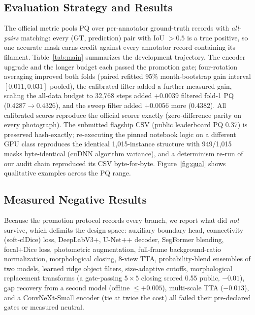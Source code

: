 \documentclass[sigconf]{acmart}
\begin{document}
\subsection{Evaluation Strategy and Results}
The official metric pools PQ over per-annotator ground-truth records with \emph{all-pairs} matching: every (GT, prediction) pair with IoU $>0.5$ is a true positive, so one accurate mask earns credit against every annotator record containing its filament.
Table~\ref{tab:main} summarizes the development trajectory.
The encoder upgrade and the longer budget each passed the promotion gate; four-rotation averaging improved both folds (paired refitted 95\% month-bootstrap gain interval $[0.011, 0.031]$ pooled), the calibrated filter added a further measured gain, scaling the all-data budget to 32{,}768 steps added $+0.0039$ filtered fold-1 PQ (0.4287$\to$0.4326), and the sweep filter added $+0.0056$ more (0.4382).
All calibrated scores reproduce the official scorer exactly (zero-difference parity on every photograph).
The submitted flagship CSV (public leaderboard PQ 0.37) is preserved hash-exactly; re-executing the pinned notebook logic on a different GPU class reproduces the identical 1{,}015-instance structure with 949/1{,}015 masks byte-identical (cuDNN algorithm variance), and a determinism re-run of our audit chain reproduced its CSV byte-for-byte.
Figure~\ref{fig:qual} shows qualitative examples across the PQ range.

\subsection{Measured Negative Results}
Because the promotion protocol records every branch, we report what did \emph{not} survive, which delimits the design space:
auxiliary boundary head, connectivity (soft-clDice) loss, DeepLabV3+, U-Net++ decoder, SegFormer blending, focal+Dice loss, photometric augmentation, full-frame background-ratio normalization, morphological closing, 8-view TTA, probability-blend ensembles of two models, learned ridge object filters, size-adaptive cutoffs, morphological replacement transforms (a gate-passing $5\times5$ closing scored 0.55 public, $-0.01$), gap recovery from a second model (offline $\le{+}0.005$), multi-scale TTA ($-0.013$), and a ConvNeXt-Small encoder (tie at twice the cost) all failed their pre-declared gates or measured neutral.
\end{document}
